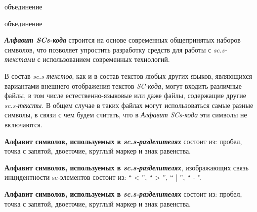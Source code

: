 \begin{SCn}
	\begin{scnreltoset}{объединение}
			\begin{scnreltoset}{объединение}
			\end{scnreltoset}
	\end{scnreltoset}
\end{SCn} 

\textbf{\textit{Алфавит SCs-кода\scnsupergroupsign}} строится на основе современных общепринятых наборов символов, что позволяет упростить разработку средств для работы с \textit{sc.s-текстами} с использованием современных технологий.

В состав \textit{sc.s-текстов}, как и в состав текстов любых других языков, являющихся вариантами внешнего отображения текстов \textit{SC-кода}, могут входить различные файлы, в том числе естественно-языковые или даже файлы, содержащие другие \textit{sc.s-тексты}. В общем случае в таких файлах могут использоваться самые разные символы, в связи с чем будем считать, что в \textit{Алфавит SCs-кода\scnsupergroupsign} эти символы не включаются.

\textbf{Алфавит символов, используемых в \textit{sc.s-разделителях}\scnsupergroupsign} состоит из: пробел, точка с запятой, двоеточие, круглый маркер и знак равенства.

\textbf{Алфавит символов, используемых в \textit{sc.s-разделителях}\scnsupergroupsign}, изображающих связь инцидентности sc-элементов состоит из: `` < ''{}, `` > ''{}, `` | ''{}, `` - ''{}.



\textbf{Алфавит символов, используемых в \textit{sc.s-разделителях}} состоит из: пробел, точка с запятой, двоеточие, круглый маркер и знак равенства.

